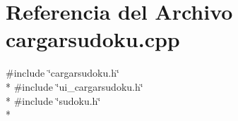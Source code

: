 \section{Referencia del Archivo cargarsudoku.\-cpp}
\label{cargarsudoku_8cpp}
{\ttfamily \#include \char`\"{}cargarsudoku.\-h\char`\"{}}\\*
{\ttfamily \#include \char`\"{}ui\-\_\-cargarsudoku.\-h\char`\"{}}\\*
{\ttfamily \#include \char`\"{}sudoku.\-h\char`\"{}}\\*
